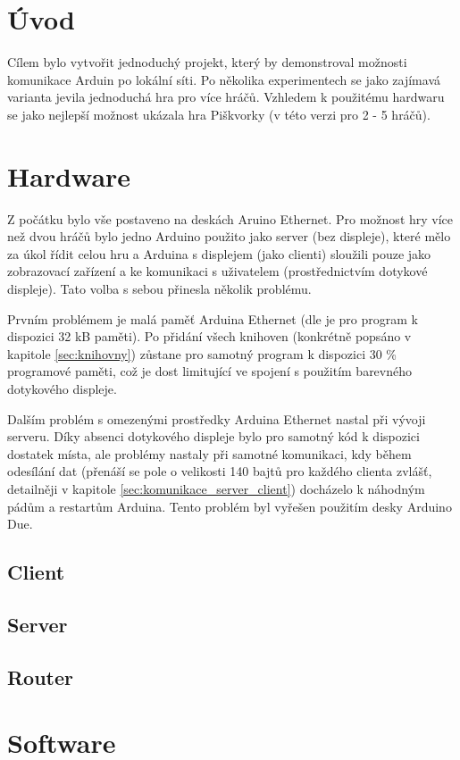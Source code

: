 \documentclass[a4paper,12pt, twoside]{article} %
\begin{document}
\section{Úvod} 
\label{sec:uvod}
Cílem bylo vytvořit jednoduchý projekt, který by demonstroval možnosti komunikace Arduin po lokální síti. Po několika experimentech se jako zajímavá varianta jevila jednoduchá hra pro více hráčů. Vzhledem k použitému hardwaru se jako nejlepší možnost ukázala hra Piškvorky (v této verzi pro 2 - 5 hráčů). 
%
%
\section{Hardware}
\label{sec:hardware}
Z počátku bylo vše postaveno na deskách Aruino Ethernet. Pro možnost hry více než dvou hráčů bylo jedno Arduino použito jako server (bez displeje), které mělo za úkol řídit celou hru a Arduina s displejem (jako clienti) sloužili pouze jako zobrazovací zařízení a ke komunikaci s uživatelem (prostřednictvím dotykové displeje). Tato volba s sebou přinesla několik problému. 

Prvním problémem je malá paměť Arduina Ethernet (dle \cite{arduinoEthernet_page} je pro program k dispozici 32 kB paměti). 
Po přidání všech knihoven (konkrétně popsáno v kapitole \ref{sec:knihovny}) zůstane pro samotný program k dispozici 30 \% programové paměti, což je dost limitující ve spojení s použitím barevného dotykového displeje.

Dalším problém s omezenými prostředky Arduina Ethernet nastal při vývoji serveru. Díky absenci dotykového displeje bylo pro samotný kód k dispozici dostatek místa, ale problémy nastaly při samotné komunikaci, kdy během odesílání dat (přenáší se pole o velikosti 140 bajtů pro každého clienta zvlášť, detailněji v kapitole   \ref{sec:komunikace_server_client}) docházelo k náhodným pádům a restartům Arduina. Tento problém byl vyřešen použitím desky Arduino Due.
%
\subsection{Client}
\label{sec:client}
%
\subsection{Server}
\label{sec:server}
%
\subsection{Router}
\label{sec:router}
%
%
%
\section{Software}
%
\end{document}
